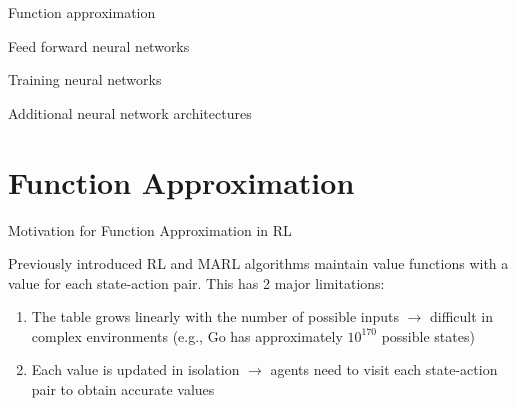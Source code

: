 

\leoslide

\subtitle{Deep Learning}


\maketitle

\introslide

\begin{frame}{\outline}

\blist
    \item Function approximation 
    \item Feed forward neural networks
    \item Training neural networks
    \item Additional neural network architectures
\elist
    
\end{frame}

\section{Function Approximation}

\begin{frame}[t]{Motivation for Function Approximation in RL}

\begin{problembox}
    Previously introduced RL and MARL algorithms maintain  value functions with a value for each state-action pair. \pause This has 2 major limitations:

    \begin{enumerate}
        \item<2-> The table grows linearly with the number of possible inputs \pause $\rightarrow$ difficult in complex environments (e.g., Go has approximately $10^{170}$ possible states)
        \item<4-> Each value is updated in isolation \pause\pause $\rightarrow$ agents need to visit each state-action pair to obtain accurate values
    \end{enumerate}
    \vspace{-.5em}
\end{problembox}

\end{frame}

